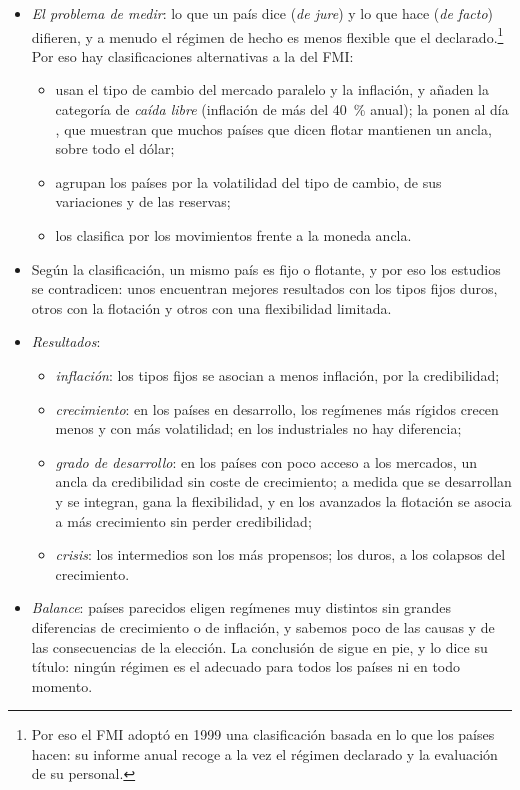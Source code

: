 \documentclass[11pt]{article}
\begin{document}
\begin{itemize}
\item \emph{El problema de medir}: lo que un país dice (\emph{de jure}) y lo que hace (\emph{de facto}) difieren, y a menudo el régimen de hecho es menos flexible que el declarado.\footnote{Por eso el FMI adoptó en 1999 una clasificación basada en lo que los países hacen: su informe anual recoge a la vez el régimen declarado y la evaluación de su personal\nocite{FMI2004Clasificacion}.} Por eso hay clasificaciones alternativas a la del FMI:
  \begin{itemize}
  \item \textcite{ReinhartRogoff2004Modern} usan el tipo de cambio del mercado paralelo y la inflación, y añaden la categoría de \emph{caída libre} (inflación de más del 40~\% anual); la ponen al día \textcite{IlzetzkiReinhartRogoff2019}, que muestran que muchos países que dicen flotar mantienen un ancla, sobre todo el dólar;
  \item \textcite{LevyYeyatiSturzenegger2005Classifying} agrupan los países por la volatilidad del tipo de cambio, de sus variaciones y de las reservas;
  \item \textcite{Shambaugh2004Effect} los clasifica por los movimientos frente a la moneda ancla.
  \end{itemize}
\item Según la clasificación, un mismo país es fijo o flotante, y por eso los estudios se contradicen: unos encuentran mejores resultados con los tipos fijos duros, otros con la flotación y otros con una flexibilidad limitada.
\item \emph{Resultados}:
  \begin{itemize}
  \item \emph{inflación}: los tipos fijos se asocian a menos inflación, por la credibilidad\nocite{GhoshGuldeWolf2002Exchange};
  \item \emph{crecimiento}: en los países en desarrollo, los regímenes más rígidos crecen menos y con más volatilidad; en los industriales no hay diferencia\nocite{LevyYeyatiSturzenegger2003Float};
  \item \emph{grado de desarrollo}: en los países con poco acceso a los mercados, un ancla da credibilidad sin coste de crecimiento; a medida que se desarrollan y se integran, gana la flexibilidad, y en los avanzados la flotación se asocia a más crecimiento sin perder credibilidad\nocite{RogoffEtAl2004Evolution};
  \item \emph{crisis}: los intermedios son los más propensos; los duros, a los colapsos del crecimiento\nocite{GhoshOstryQureshi2015}.
  \end{itemize}
\item \emph{Balance}: países parecidos eligen regímenes muy distintos sin grandes diferencias de crecimiento o de inflación, y sabemos poco de las causas y de las consecuencias de la elección\nocite{Rose2011Flaky}. La conclusión de \textcite{Frankel1999NoSingle} sigue en pie, y lo dice su título: ningún régimen es el adecuado para todos los países ni en todo momento.
\end{itemize}
\end{document}
